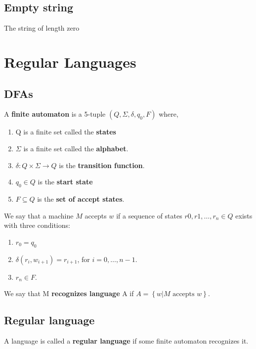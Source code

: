 \documentclass[a4paper]{article}
\begin{document}
\subsection{Empty string} %
\label{sub:Empty string}
The string of length zero


\section{Regular Languages} %
\label{sec:Regular Laguages}
\subsection{DFAs} %
\label{sub:Finite Automaton}
A {\bf finite automaton} is a 5-tuple $(Q,\Sigma,\delta,q_0,F)$ where,
\begin{enumerate}
  \item Q is a finite set called the {\bf states}
  \item $\Sigma$ is a finite set called the {\bf alphabet}.
  \item $\delta:Q \times \Sigma \rightarrow Q$ is the {\bf transition function}.
  \item $q_0 \in Q$ is the {\bf start state}
  \item $F \subseteq Q$ is the {\bf set of accept states}.
\end{enumerate}
We say that a machine $M$ accepts $w$ if a sequence of states $r0,r1,\dots,r_n \in Q$ exists with three conditions:
\begin{enumerate}
  \item $r_0=q_0$
  \item $\delta(r_i,w_{i+1})= r_{i+1}$, for $i=0,\dots,n-1$.
  \item $r_n \in F$.
\end{enumerate}
We say that M {\bf recognizes language} A if $A=\left\{ w | M \text{ accepts }w \right\}$.

\subsection{Regular language} %
\label{sub:Regular language}
A language is called a {\bf regular language} if some finite automaton recognizes it.
\end{document}
